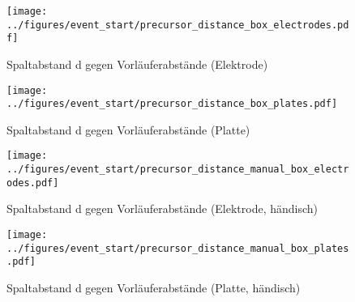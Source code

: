 \begin{figure}[htbp]
    \centering
    \begin{minipage}[t]{0.47\textwidth}
      \centering
      \texttt{[image: ../figures/event\_start/precursor\_distance\_box\_electrodes.pdf]}
      \caption{Spaltabstand d gegen Vorläuferabstände (Elektrode)}
      \label{fig:box-precdistance-electrode}
   \end{minipage}
 \begin{minipage}[t]{0.47\textwidth}
      \centering
      \texttt{[image: ../figures/event\_start/precursor\_distance\_box\_plates.pdf]}
      \caption{Spaltabstand d gegen Vorläuferabstände (Platte)}
      \label{fig:box-precdistance-plate}
  \end{minipage}
\begin{minipage}[t]{0.47\textwidth}
      \centering
      \texttt{[image: ../figures/event\_start/precursor\_distance\_manual\_box\_electrodes.pdf]}
      \caption{Spaltabstand d gegen Vorläuferabstände (Elektrode, händisch)}
      \label{fig:box-precdistance-electrode-hand}
   \end{minipage}
 \begin{minipage}[t]{0.47\textwidth}
      \centering
      \texttt{[image: ../figures/event\_start/precursor\_distance\_manual\_box\_plates.pdf]}
      \caption{Spaltabstand d gegen Vorläuferabstände (Platte, händisch)}
      \label{fig:box-precdistance-plate-hand}
  \end{minipage}

\end{figure}





